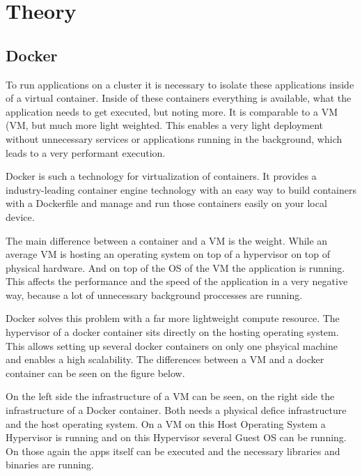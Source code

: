 \chapter{Theory}

\section{Docker} 

To run applications on a cluster it is necessary to isolate these applications inside of a virtual container. Inside of these containers everything is available, what the application needs to get executed, but noting more. It is comparable to a \acs{VM} (\acl{VM}, but much more light weighted. This enables a very light deployment without unnecessary services or applications running in the background, which leads to a very performant execution.


Docker is such a technology for virtualization of containers. It provides a industry-leading container engine technology with an easy way to build containers with a Dockerfile and manage and run those containers easily on your local device.


The main difference between a container and a VM is the weight. While an average VM is hosting an operating system on top of a hypervisor on top of physical hardware. And on top of the OS of the VM the application is running. This affects the performance and the speed of the application in a very negative way, because a lot of unnecessary background proccesses are running. 

Docker solves this problem with a far more lightweight compute resource. The hypervisor of a docker container sits directly on the hosting operating system. This allows setting up several docker containers on only one phsyical machine and enables a high scalability. The differences between a VM and a docker container can be seen on the figure below.


On the left side the infrastructure of a VM can be seen, on the right side the infrastructure of a Docker container. Both needs a physical defice infrastructure and the host operating system. On a VM on this Host Operating System a Hypervisor is running and on this Hypervisor several Guest OS can be running. On those again the apps itself can be executed and the necessary libraries and binaries are running.


